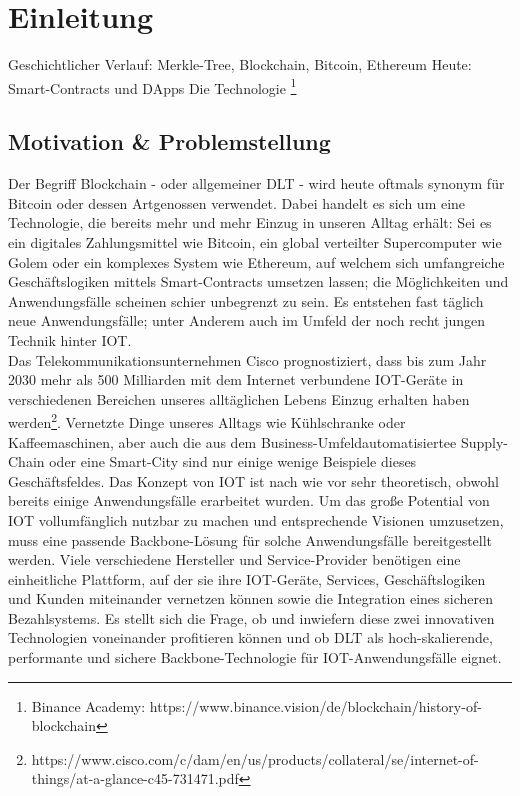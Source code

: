 \chapter{Einleitung}
\label{ch:intro}
Geschichtlicher Verlauf: Merkle-Tree, Blockchain, Bitcoin, Ethereum
Heute: Smart-Contracts und \ac{DApp}s
Die Technologie
\footnote{Binance Academy: https://www.binance.vision/de/blockchain/history-of-blockchain}

%
%
\section{Motivation \& Problemstellung}
\label{sec:intro:motivation}
Der Begriff Blockchain - oder allgemeiner \ac{DLT} - wird heute oftmals synonym für Bitcoin oder dessen Artgenossen verwendet. Dabei handelt es sich um eine Technologie, die bereits mehr und mehr Einzug in unseren Alltag erhält: Sei es ein digitales Zahlungsmittel wie Bitcoin, ein global verteilter Supercomputer wie Golem oder ein komplexes System wie Ethereum, auf welchem sich umfangreiche Geschäftslogiken mittels Smart-Contracts umsetzen lassen; die Möglichkeiten und Anwendungsfälle scheinen schier unbegrenzt zu sein. Es entstehen fast täglich neue Anwendungsfälle; unter Anderem auch im Umfeld der noch recht jungen Technik hinter \ac{IOT}.\\
Das Telekommunikationsunternehmen Cisco prognostiziert, dass bis zum Jahr 2030 mehr als 500 Milliarden mit dem Internet verbundene \ac{IOT}-Geräte in verschiedenen Bereichen unseres alltäglichen Lebens Einzug erhalten haben werden\footnote{https://www.cisco.com/c/dam/en/us/products/collateral/se/internet-of-things/at-a-glance-c45-731471.pdf}. Vernetzte Dinge unseres Alltags wie Kühlschranke oder Kaffeemaschinen, aber auch die aus dem Business-Umfeldautomatisiertee Supply-Chain oder eine Smart-City sind nur einige wenige Beispiele dieses Geschäftsfeldes. Das Konzept von \ac{IOT} ist nach wie vor sehr theoretisch, obwohl bereits einige Anwendungsfälle erarbeitet wurden. Um das große Potential von \ac{IOT} vollumfänglich nutzbar zu machen und entsprechende Visionen umzusetzen, muss eine passende Backbone-Lösung für solche Anwendungsfälle bereitgestellt werden. Viele verschiedene Hersteller und Service-Provider benötigen eine einheitliche Plattform, auf der sie ihre \ac{IOT}-Geräte, Services, Geschäftslogiken und Kunden miteinander vernetzen können sowie die Integration eines sicheren Bezahlsystems. Es stellt sich die Frage, ob und inwiefern diese zwei innovativen Technologien voneinander profitieren können und ob \ac{DLT} als hoch-skalierende, performante und sichere Backbone-Technologie für \ac{IOT}-Anwendungsfälle eignet.

